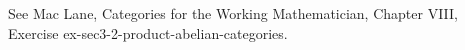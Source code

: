 See Mac Lane, Categories for the Working Mathematician, Chapter VIII, Exercise ex-sec3-2-product-abelian-categories.
